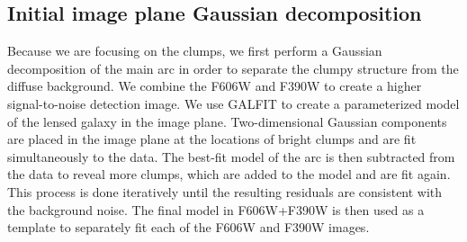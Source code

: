 \subsection{Initial image plane Gaussian decomposition}
Because we are focusing on the clumps, we first perform a Gaussian decomposition of the main arc in order to separate the clumpy structure from the diffuse background. We combine the F606W and F390W to create a higher signal-to-noise detection image. We use GALFIT \citep{Peng:2010qy} to create a parameterized model of the lensed galaxy in the image plane. Two-dimensional Gaussian components are placed in the image plane at the locations of bright clumps and are fit simultaneously to the data.  The best-fit model of the arc is then subtracted from the data to reveal more clumps, which are added to the model and are fit again. This process is done iteratively until the resulting residuals are consistent with the background noise. The final model in F606W+F390W is then used as a template to separately fit each of the F606W and F390W images.

